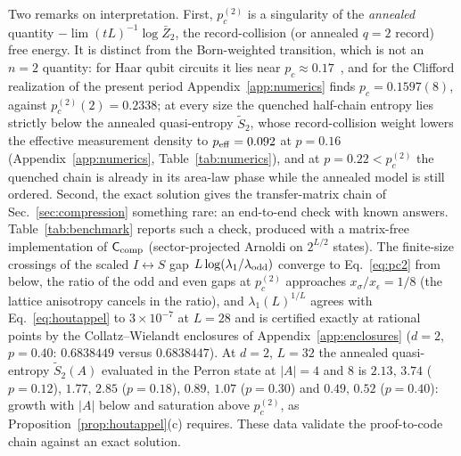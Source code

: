 \documentclass[aps,prx,reprint,superscriptaddress,nobibnotes,longbibliography]{revtex4-2}
\theoremstyle{remark}
\newcommand{\Ccomp}{\mathsf C_{\rm comp}}
\begin{document}
Two remarks on interpretation.  First, $p_c^{(2)}$ is a singularity of the \emph{annealed} quantity $-\lim(tL)^{-1}\log\bar Z_2$, the record-collision (or annealed $q=2$ record) free energy.  It is distinct from the Born-weighted transition, which is not an $n=2$ quantity: for Haar qubit circuits it lies near $p_c\approx0.17$~\cite{Zabalo2020}, and for the Clifford realization of the present period Appendix~\ref{app:numerics} finds $p_c=0.1597(8)$, against $p_c^{(2)}(2)=0.2338$; at every size the quenched half-chain entropy lies strictly below the annealed quasi-entropy $\tilde S_2$, whose record-collision weight lowers the effective measurement density to $p_{\rm eff}=0.092$ at $p=0.16$ (Appendix~\ref{app:numerics}, Table~\ref{tab:numerics}), and at $p=0.22<p_c^{(2)}$ the quenched chain is already in its area-law phase while the annealed model is still ordered.  Second, the exact solution gives the transfer-matrix chain of Sec.~\ref{sec:compression} something rare: an end-to-end check with known answers.  Table~\ref{tab:benchmark} reports such a check, produced with a matrix-free implementation of $\Ccomp$ (sector-projected Arnoldi on $2^{L/2}$ states).  The finite-size crossings of the scaled $I\leftrightarrow S$ gap $L\log(\lambda_1/\lambda_{\rm odd})$ converge to Eq.~\eqref{eq:pc2} from below, the ratio of the odd and even gaps at $p_c^{(2)}$ approaches $x_\sigma/x_\epsilon=1/8$ (the lattice anisotropy cancels in the ratio), and $\lambda_1(L)^{1/L}$ agrees with Eq.~\eqref{eq:houtappel} to $3\times10^{-7}$ at $L=28$ and is certified exactly at rational points by the Collatz--Wielandt enclosures of Appendix~\ref{app:enclosures} ($d=2$, $p=0.40$: $0.6838449$ versus $0.6838447$).  At $d=2$, $L=32$ the annealed quasi-entropy $\tilde S_2(A)$ evaluated in the Perron state at $|A|=4$ and $8$ is $2.13,\,3.74$ ($p=0.12$), $1.77,\,2.85$ ($p=0.18$), $0.89,\,1.07$ ($p=0.30$) and $0.49,\,0.52$ ($p=0.40$): growth with $|A|$ below and saturation above $p_c^{(2)}$, as Proposition~\ref{prop:houtappel}(c) requires.  These data validate the proof-to-code chain against an exact solution.
\end{document}
